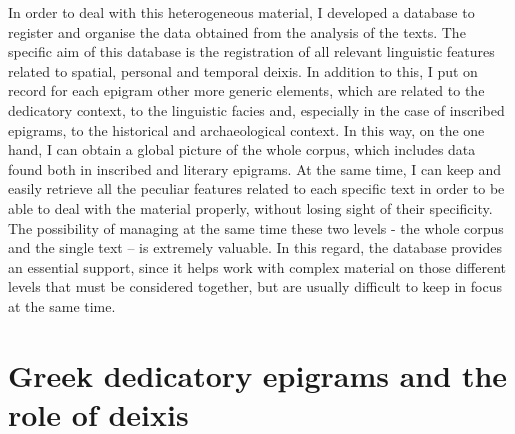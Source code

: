 \documentclass[amsthm,ebook]{saparticle}
\begin{document}
In order to deal with this heterogeneous material, I developed a database to register and organise the data obtained
from the analysis of the texts. The specific aim of this database is the registration of all relevant linguistic
features related to spatial, personal and temporal deixis. In addition to this, I put on record for each epigram other
more generic elements, which are related to the dedicatory context, to the linguistic facies and, especially in the
case of inscribed epigrams, to the historical and archaeological context. In this way, on the one hand, I can obtain a
global picture of the whole corpus, which includes data found both in inscribed and literary epigrams. At the same
time, I can keep and easily retrieve all the peculiar features related to each specific text in order to be able to
deal with the material properly, without losing sight of their specificity. The possibility of managing at the same
time these two levels - the whole corpus and the single text – is extremely valuable. In this regard, the database
provides an essential support, since it helps work with complex material on those different levels that must be
considered together, but are usually difficult to keep in focus at the same time.




\section{Greek dedicatory epigrams and the role of deixis}
\end{document}
